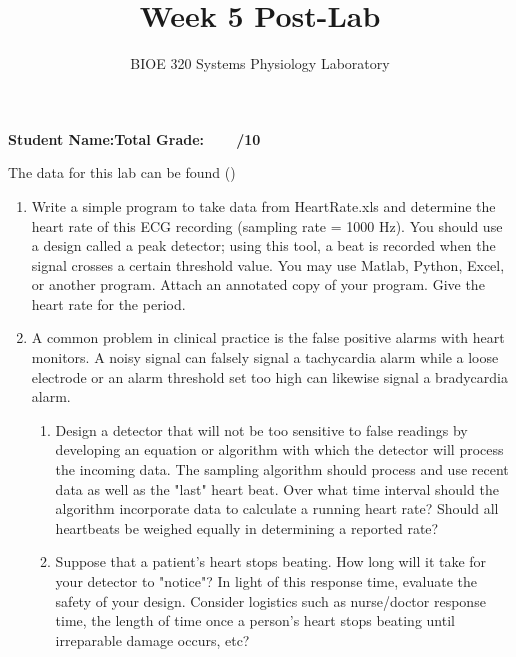 \documentclass{article}
\title{Week 5 Post-Lab}
\author{BIOE 320 Systems Physiology Laboratory}
\date{}
\begin{document}
\maketitle
\large

\textbf{Student Name:}\hfill 	\textbf{Total Grade:\ \ \ \ /10}\vspace{0.5cm}

\begin{info}
	The data for this lab can be found ()
\end{info}

\begin{enumerate}
	\item Write a simple program to take data from HeartRate.xls and determine the heart rate of this ECG recording (sampling rate = 1000 Hz). You should use a design called a peak detector; using this tool, a beat is recorded when the signal crosses a certain threshold value. You may use Matlab, Python, Excel, or another program. Attach an annotated copy of your program. Give the heart rate for the period.
	\item A common problem in clinical practice is the false positive alarms with heart monitors. A noisy signal can falsely signal a tachycardia alarm while a loose electrode or an alarm threshold set too high can likewise signal a bradycardia alarm.
	\begin{enumerate}
		\item Design a detector that will not be too sensitive to false readings by developing an equation or algorithm with which the detector will process the incoming data. The sampling algorithm should process and use recent data as well as the "last" heart beat. Over what time interval should the algorithm incorporate data to calculate a running heart rate? Should all heartbeats be weighed equally in determining a reported rate?
		\item Suppose that a patient's heart stops beating. How long will it take for your detector to "notice"? In light of this response time, evaluate the safety of your design. Consider logistics such as nurse/doctor response time, the length of time once a person's heart stops beating until irreparable damage occurs, etc?
	\end{enumerate}
\end{enumerate}
\end{document}
